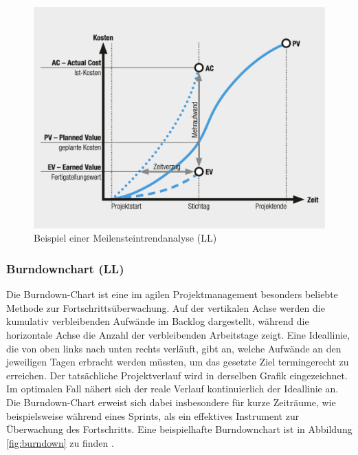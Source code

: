 \documentclass[ThesisDJ.tex]{subfiles}
\begin{document}
    \begin{figure}
        \includegraphics[scale=0.5]{mta.png}
        \centering
        \caption{Beispiel einer Meilensteintrendanalyse (LL)}
        \label{fig:mta}
    \end{figure}

    \subsubsection{Burndownchart (LL)}
    Die Burndown-Chart ist eine im agilen Projektmanagement besonders beliebte Methode zur Fortschrittsüberwachung. 
    Auf der vertikalen Achse werden die kumulativ verbleibenden Aufwände im Backlog dargestellt, während die horizontale Achse die Anzahl der verbleibenden Arbeitstage zeigt. 
    Eine Ideallinie, die von oben links nach unten rechts verläuft, gibt an, welche Aufwände an den jeweiligen Tagen erbracht werden müssten, um das gesetzte Ziel termingerecht zu erreichen. 
    Der tatsächliche Projektverlauf wird in derselben Grafik eingezeichnet. Im optimalen Fall nähert sich der reale Verlauf kontinuierlich der Ideallinie an. 
    Die Burndown-Chart erweist sich dabei insbesondere für kurze Zeiträume, wie beispielsweise während eines Sprints, als ein effektives Instrument zur Überwachung des Fortschritts.
    Eine beispielhafte Burndownchart ist in Abbildung \ref{fig:burndown} zu finden \cite[S.~279]{dechange_projektmanagement_2024}.
\end{document}
